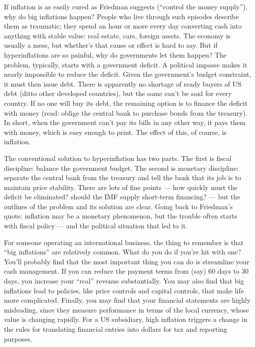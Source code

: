 \documentclass[letterpaper,12pt]{article}
\begin{document}
If inflation is as easily cured as Friedman suggests
(``control the money supply''),
why do big inflations happen?
People who live through such
episodes describe them as traumatic; they spend an hour or more
every day converting cash into anything with stable value:  real estate,
cars, foreign assets.
The economy is usually a mess, but whether's that cause or effect is
hard to say.
But if hyperinflations are so painful, why do governments let them happen?
The problem, typically, starts with a government deficit.
A political impasse makes it nearly impossible to reduce the deficit.
Given the government's budget constraint, it must then issue debt.
There is apparently no shortage of ready buyers of US debt
(ditto other developed countries),
but the same can't be said for every country.
If no one will buy its debt,
the remaining option is to finance the deficit with money
(read: oblige the central bank to purchase bonds
from the treasury).
In short, when the government can't
pay its bills in any other way, it pays them with money, which is
easy enough to print.
The effect of this, of course, is inflation.


The conventional solution to hyperinflation has two parts.  The
first is fiscal discipline: balance the government budget.  The
second is monetary discipline: separate the central bank
from the treasury and tell the bank that its job is to maintain
price stability. There are lots of fine points --- how quickly must
the deficit be eliminated?  should the IMF supply short-term
financing?  --- but the outlines of the problem and its solution
are clear.
Going back to Friedman's quote: inflation may be a monetary phenomenon,
but the trouble often starts with fiscal policy ---
and the political situation that led to it.

For someone operating an international business,
the thing to remember is that ``big inflations''
are relatively common.
What do you do if you're hit with one?
You'll probably find that the
most important thing you can do is streamline your cash management.
If you can reduce the payment
terms from (say) 60 days to 30 days, you increase your ``real'' revenue substantially.
You may also find that big inflations lead to policies,
like price controls and capital controls,
that make life more complicated.
Finally, you may find that your financial statements
are highly misleading, since they measure performance in terms of the local
currency, whose value is changing rapidly.
For a US subsidiary, high inflation triggers a change
in the rules for translating financial entries into dollars for tax and reporting purposes.
\end{document}
